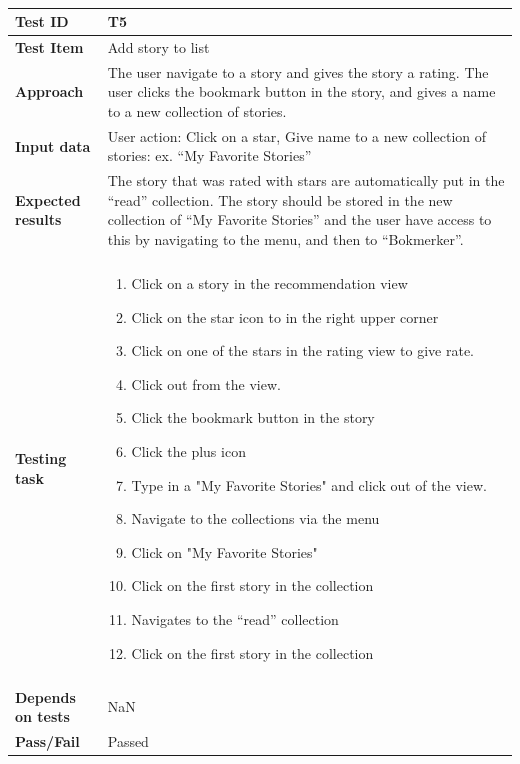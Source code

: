 \begin{appendices}
\begin{table}[H]
	\label{Tab:systemTesting4}
	\end{table}


	\begin{table}[H]
		\centering
		\caption{}
		\begin{tabular}{ | l | l  |}
			\hline 
			\textbf{Test ID} & T5  \\ \hline
			\textbf{Test Item}  & Add story to list	 \\ \hline
			\textbf{Approach} & \begin{minipage}{5in}The user navigate to a story and gives the story a rating. The user clicks the bookmark button in the story, and gives a name to a new collection of stories.   \end{minipage}\\ \hline
			\textbf{Input data} & \begin{minipage}{5in}User action: Click on a star, Give name to a new collection of stories: ex. “My Favorite Stories” \end{minipage}\\ \hline
			\textbf{Expected results} & \begin{minipage}{5in}The story that was rated with stars are automatically put in the “read” collection. The story should be stored in the new collection of “My Favorite Stories” and the user have access to this by navigating to the menu, and then to “Bokmerker”. \end{minipage}\\ \hline&\\[-3.8ex]
			\textbf{Testing task} & \begin{minipage}{5in}
			\begin{enumerate}[noitemsep]
			\item Click on a story in the recommendation view 
			\item Click on the star icon to in the right upper corner 
			\item Click on one of the stars in the rating view to give rate.
			\item Click out from the view. 
			\item Click the bookmark button in the story 
			\item Click the plus icon
			\item Type in a "My Favorite Stories" and click out of the view.
			\item Navigate to the collections via the menu
			\item Click on "My Favorite Stories"
			\item Click on the first story in the collection
			\item Navigates to the “read” collection
			\item Click on the first story in the collection
			\end{enumerate}\end{minipage}
			\\ &\\[-3.8ex]\hline
			\textbf{Depends on tests} & NaN \\ \hline			
			\textbf{Pass/Fail} & Passed \\\hline		
		\end{tabular}
	

\end{table}
\end{appendices}
